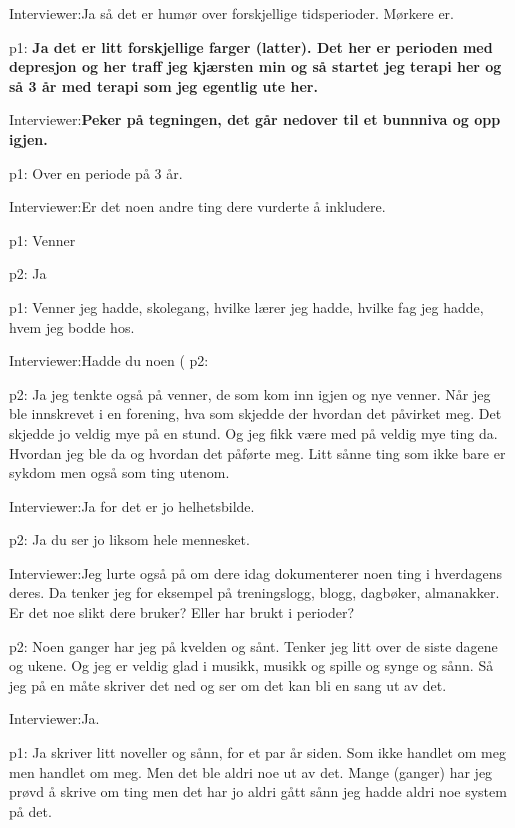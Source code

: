 \documentclass[../../MasterThesis.tex]{subfiles}
\begin{document}
\textcolor{myBlue} {Interviewer:}Ja så det er humør over forskjellige tidsperioder. Mørkere er. 

\textcolor{myGreen} {p1:} \textbf{Ja det er litt forskjellige farger (latter). Det her er perioden med depresjon og her traff jeg kjærsten min og så startet jeg terapi her og så 3 år med terapi som jeg egentlig ute her.}

\textcolor{myBlue} {Interviewer:}\textbf{Peker på tegningen, det går nedover til et bunnniva og opp igjen.}

\textcolor{myGreen} {p1:} Over en periode på 3 år.

\textcolor{myBlue} {Interviewer:}Er det noen andre ting dere vurderte å inkludere. 

\textcolor{myGreen} {p1:} Venner

\textcolor{myYellow} {p2:} Ja

\textcolor{myGreen} {p1:} Venner jeg hadde, skolegang, hvilke lærer jeg hadde, hvilke fag jeg hadde, hvem jeg bodde hos.

\textcolor{myBlue} {Interviewer:}Hadde du noen (
\textcolor{myYellow} {p2:}

\textcolor{myYellow} {p2:} Ja jeg tenkte også på venner, de som kom inn igjen og nye venner. Når jeg ble innskrevet i en forening, hva som skjedde der hvordan det påvirket meg. Det skjedde jo veldig mye på en stund. Og jeg fikk være med på veldig mye ting da. Hvordan jeg ble da og hvordan det påførte meg. Litt sånne ting som ikke bare er sykdom men også som ting utenom.

\textcolor{myBlue} {Interviewer:}Ja for det er jo helhetsbilde.

\textcolor{myYellow} {p2:} Ja du ser jo liksom hele mennesket.

\textcolor{myBlue} {Interviewer:}Jeg lurte også på om dere idag dokumenterer noen ting i hverdagens deres. Da tenker jeg for eksempel på treningslogg, blogg, dagbøker, almanakker. Er det noe slikt dere bruker? Eller har brukt i perioder?

\textcolor{myYellow} {p2:} Noen ganger har jeg på kvelden og sånt. Tenker jeg litt over de siste dagene og ukene. Og jeg er veldig glad i musikk, musikk og spille og synge og sånn. Så jeg på en måte skriver det ned og ser om det kan bli en sang ut av det.

\textcolor{myBlue} {Interviewer:}Ja.

\textcolor{myGreen} {p1:} Ja skriver litt noveller og sånn, for et par år siden. Som ikke handlet om meg men handlet om meg. Men det ble aldri noe ut av det. Mange (ganger) har jeg prøvd å skrive om ting men det har jo aldri gått sånn jeg hadde aldri noe system på det. 
\end{document}
